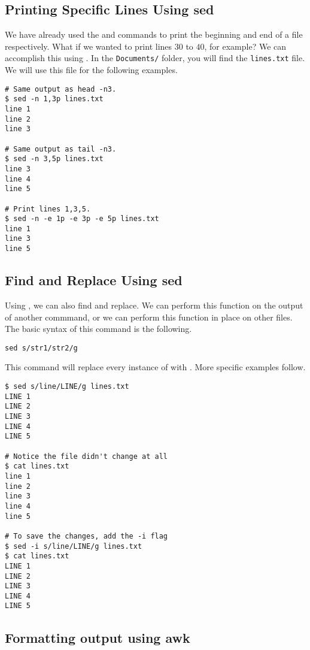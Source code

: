 \subsection*{Printing Specific Lines Using sed} %

We have already used the  and  commands to print the beginning and end of a file respectively.
What if we wanted to print lines $30$ to $40$, for example?
We can accomplish this using .
In the \texttt{Documents/} folder, you will find the \texttt{lines.txt} file.
We will use this file for the following examples.

\begin{lstlisting}
# Same output as head -n3.
$ sed -n 1,3p lines.txt
line 1
line 2
line 3

# Same output as tail -n3.
$ sed -n 3,5p lines.txt
line 3
line 4
line 5

# Print lines 1,3,5.
$ sed -n -e 1p -e 3p -e 5p lines.txt
line 1
line 3
line 5
\end{lstlisting}

\subsection*{Find and Replace Using sed} %

Using , we can also find and replace.
We can perform this function on the output of another commmand, or we can perform this function in place on other files.
The basic syntax of this  command is the following.

\begin{lstlisting}
sed s/str1/str2/g
\end{lstlisting}

This command will replace every instance of  with . More specific examples follow.

\begin{lstlisting}
$ sed s/line/LINE/g lines.txt
LINE 1
LINE 2
LINE 3
LINE 4
LINE 5

# Notice the file didn't change at all
$ cat lines.txt
line 1
line 2
line 3
line 4
line 5

# To save the changes, add the -i flag
$ sed -i s/line/LINE/g lines.txt
$ cat lines.txt
LINE 1
LINE 2
LINE 3
LINE 4
LINE 5
\end{lstlisting}

\subsection*{Formatting output using awk} %

